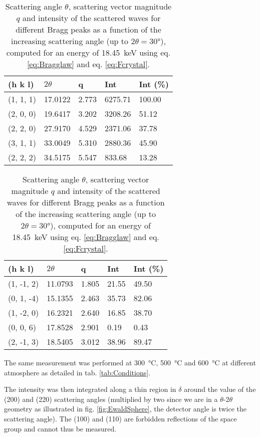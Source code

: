 \begin{table}[htb!]
    \begin{minipage}{.45\linewidth}
        \centering
        \begin{tabular}{@{}lllll@{}}
        \toprule
        (h k l) & $2\theta$ & q & Int & Int (\%) \\
        \midrule
        (1, 1, 1) & 17.0122 & 2.773 & 6275.71 & 100.00 \\
        (2, 0, 0) & 19.6417 & 3.202 & 3208.26 & 51.12 \\
        (2, 2, 0) & 27.9170 & 4.529 & 2371.06 & 37.78 \\
        (3, 1, 1) & 33.0049 & 5.310 & 2880.36 & 45.90 \\
        (2, 2, 2) & 34.5175 & 5.547 & 833.68 & 13.28 \\
        \bottomrule
        \end{tabular}%
    \end{minipage}%
    \hfill
    \begin{minipage}{.45\linewidth}
        \centering
        \begin{tabular}{@{}lllll@{}}
        \toprule
        (h k l) & $2\theta$ & q & Int & Int (\%) \\
        \midrule
        (1, -1, 2) & 11.0793 & 1.805 & 21.55 & 49.50 \\
        (0, 1, -4) & 15.1355 & 2.463 & 35.73 & 82.06 \\
        (1, -2, 0) & 16.2321 & 2.640 & 16.85 & 38.70 \\
        (0, 0, 6)  & 17.8528 & 2.901 & 0.19  & 0.43  \\
        (2, -1, 3) & 18.5405 & 3.012 & 38.96 & 89.47 \\
        \bottomrule
        \end{tabular}%
    \end{minipage}%
    \label{tab:Reflections}
    \caption{
        Scattering angle $\theta$, scattering vector magnitude $q$ and intensity of the scattered waves for different Bragg peaks as a function of the increasing scattering angle (up to $2\theta = \ang{30}$), computed for an energy of \qty{18.45}{\keV} using eq. \ref{eq:Bragglaw} and eq. \ref{eq:Fcrystal}.
    }
\end{table}


The same measurement was performed at \qty{300}{\degreeCelsius}, \qty{500}{\degreeCelsius} and \qty{600}{\degreeCelsius} at different atmosphere as detailed in tab. \ref{tab:Conditions}.

The intensity was then integrated along a thin region in $\delta$ around the value of the (200) and (220) scattering angles (multiplied by two since we are in a $\theta$-$2\theta$ geometry as illustrated in fig. \ref{fig:EwaldSphere}, the detector angle is twice the scattering angle).
The (100) and (110) are forbidden reflections of the space group and cannot thus be measured.

